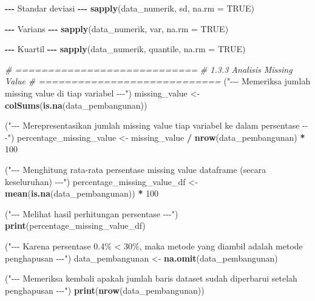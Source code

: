 \documentclass[
  12pt,
]{article}
\newenvironment{Shaded}{\begin{snugshade}}{\end{snugshade}}
\newcommand{\AttributeTok}[1]{\textcolor[rgb]{0.13,0.29,0.53}{#1}}
\newcommand{\CommentTok}[1]{\textcolor[rgb]{0.56,0.35,0.01}{\textit{#1}}}
\newcommand{\ConstantTok}[1]{\textcolor[rgb]{0.56,0.35,0.01}{#1}}
\newcommand{\DecValTok}[1]{\textcolor[rgb]{0.00,0.00,0.81}{#1}}
\newcommand{\FunctionTok}[1]{\textcolor[rgb]{0.13,0.29,0.53}{\textbf{#1}}}
\newcommand{\NormalTok}[1]{#1}
\newcommand{\OtherTok}[1]{\textcolor[rgb]{0.56,0.35,0.01}{#1}}
\newcommand{\SpecialCharTok}[1]{\textcolor[rgb]{0.81,0.36,0.00}{\textbf{#1}}}
\newcommand{\StringTok}[1]{\textcolor[rgb]{0.31,0.60,0.02}{#1}}
\begin{document}
\begin{Shaded}
\begin{Highlighting}[]
\SpecialCharTok{{-}{-}{-}}\NormalTok{ Standar deviasi }\SpecialCharTok{{-}{-}{-}}
\FunctionTok{sapply}\NormalTok{(data\_numerik, sd, }\AttributeTok{na.rm =} \ConstantTok{TRUE}\NormalTok{)}

\SpecialCharTok{{-}{-}{-}}\NormalTok{ Varians }\SpecialCharTok{{-}{-}{-}}
\FunctionTok{sapply}\NormalTok{(data\_numerik, var, }\AttributeTok{na.rm =} \ConstantTok{TRUE}\NormalTok{)}

\SpecialCharTok{{-}{-}{-}}\NormalTok{ Kuartil }\SpecialCharTok{{-}{-}{-}}
\FunctionTok{sapply}\NormalTok{(data\_numerik, quantile, }\AttributeTok{na.rm =} \ConstantTok{TRUE}\NormalTok{)}

\CommentTok{\# ============================}
\CommentTok{\# 1.3.3 Analisis Missing Value}
\CommentTok{\# ============================}
\NormalTok{(}\StringTok{"{-}{-}{-} Memeriksa jumlah missing value di tiap variabel {-}{-}{-}"}\NormalTok{)}
\NormalTok{missing\_value }\OtherTok{\textless{}{-}} \FunctionTok{colSums}\NormalTok{(}\FunctionTok{is.na}\NormalTok{(data\_pembangunan))}

\NormalTok{(}\StringTok{"{-}{-}{-} Merepresentasikan jumlah missing value tiap variabel ke dalam persentase {-}{-}{-}"}\NormalTok{)}
\NormalTok{percentage\_missing\_value }\OtherTok{\textless{}{-}}\NormalTok{ missing\_value }\SpecialCharTok{/} \FunctionTok{nrow}\NormalTok{(data\_pembangunan) }\SpecialCharTok{*} \DecValTok{100}

\NormalTok{(}\StringTok{"{-}{-}{-} Menghitung rata{-}rata persentase missing value dataframe (secara keseluruhan) {-}{-}{-}"}\NormalTok{)}
\NormalTok{percentage\_missing\_value\_df }\OtherTok{\textless{}{-}} \FunctionTok{mean}\NormalTok{(}\FunctionTok{is.na}\NormalTok{(data\_pembangunan)) }\SpecialCharTok{*} \DecValTok{100}

\NormalTok{(}\StringTok{"{-}{-}{-} Melihat hasil perhitungan persentase {-}{-}{-}"}\NormalTok{)}
\FunctionTok{print}\NormalTok{(percentage\_missing\_value\_df)}

\NormalTok{(}\StringTok{"{-}{-}{-} Karena persentase 0.4\% \textless{} 30\%, maka metode yang diambil adalah metode penghapusan {-}{-}{-}"}\NormalTok{)}
\NormalTok{data\_pembangunan }\OtherTok{\textless{}{-}} \FunctionTok{na.omit}\NormalTok{(data\_pembangunan)}

\NormalTok{(}\StringTok{"{-}{-}{-} Memeriksa kembali apakah jumlah baris dataset sudah diperbarui setelah penghapusan {-}{-}{-}"}\NormalTok{)}
\FunctionTok{print}\NormalTok{(}\FunctionTok{nrow}\NormalTok{(data\_pembangunan))}


\end{Highlighting}
\end{Shaded}
\end{document}
